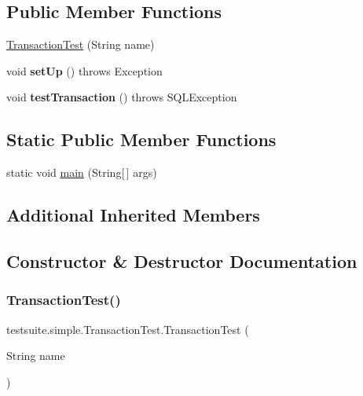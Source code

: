 \subsection*{Public Member Functions}
\begin{DoxyCompactItemize}
\item 
\mbox{\hyperlink{classtestsuite_1_1simple_1_1_transaction_test_a05b3cfd3ac06847339ca8345cda8fe96}{Transaction\+Test}} (String name)
\item 
\mbox{\label{classtestsuite_1_1simple_1_1_transaction_test_a28bb243468ffb003fc134f48ff74a740}} 
void {\bfseries set\+Up} ()  throws Exception 
\item 
\mbox{\label{classtestsuite_1_1simple_1_1_transaction_test_afd13b74216f8498467a73d6b4df6ff57}} 
void {\bfseries test\+Transaction} ()  throws S\+Q\+L\+Exception 
\end{DoxyCompactItemize}
\subsection*{Static Public Member Functions}
\begin{DoxyCompactItemize}
\item 
static void \mbox{\hyperlink{classtestsuite_1_1simple_1_1_transaction_test_a64f59050254d996e0009d60f8cfed9ae}{main}} (String\mbox{[}$\,$\mbox{]} args)
\end{DoxyCompactItemize}
\subsection*{Additional Inherited Members}


\subsection{Constructor \& Destructor Documentation}
\mbox{\label{classtestsuite_1_1simple_1_1_transaction_test_a05b3cfd3ac06847339ca8345cda8fe96}} 
\subsubsection{\texorpdfstring{Transaction\+Test()}{TransactionTest()}}
{\footnotesize\ttfamily testsuite.\+simple.\+Transaction\+Test.\+Transaction\+Test (\begin{DoxyParamCaption}\item[{String}]{name }\end{DoxyParamCaption})}


